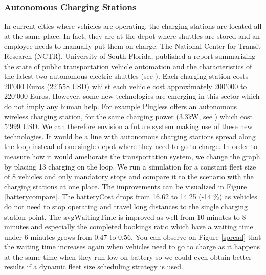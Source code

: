 \documentclass[12pt,a4paper]{article}
\begin{document}
\subsubsection{Autonomous Charging Stations}\label{spreadcharging}
In current cities where vehicles are operating, the charging stations are located all at the same place. In fact, they are at the depot where shuttles are stored and an employee needs to manually put them on charge. The National Center for Transit Research (NCTR), University of South Florida, published a report summarizing the state of public transportation vehicle automation and the characteristics of the latest two autonomous electric shuttles (see \cite{nctr}). Each charging station costs 20'000 Euros (22'558 USD) whilst each vehicle cost approximately 200'000 to 220'000 Euros. However, some new technologies are emerging in this sector which do not imply any human help. For example Plugless offers an autonomous wireless charging station, for the same charging power (3.3kW, see \cite{plugless}) which cost 5'999 USD. We can therefore envision a future system making use of these new technologies. It would be a line with autonomous charging stations spread along the loop instead of one single depot where they need to go to charge. In order to measure how it would ameliorate the transportation system, we change the graph by placing 13 charging on the loop. We run a simulation for a constant fleet size of 8 vehicles and only mandatory stops and compare it to the scenario with the charging stations at one place. The improvements can be visualized in Figure \ref{batterycompare}. The $\text{batteryCost}$ drops from 16.62 to 14.25 (-14 \%) as vehicles do not need to stop operating and travel long distances to the single charging station point. The $\text{avgWaitingTime}$ is improved as well from 10 minutes to 8 minutes and especially the completed bookings ratio which have a waiting time under 6 minutes grows from 0.47 to 0.56. You can observe on Figure \ref{spread} that the waiting time increases again when vehicles need to go to charge as it happens at the same time when they run low on battery so we could even obtain better results if a dynamic fleet size scheduling strategy is used. 
\end{document}
